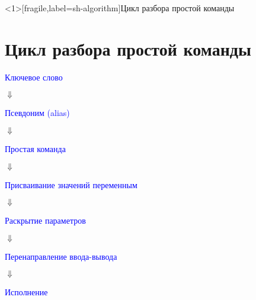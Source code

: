 % 
\begin{frame}<1>[fragile,label=sh-algorithm]{Цикл разбора простой команды}
\section{Цикл разбора простой команды}
\par\vspace{-1em}

\centering \large

\textcolor<2->{blue}{Ключевое слово}

$\Downarrow$

\textcolor<3->{blue}{Псевдоним (alias)}

$\Downarrow$

\textcolor<4->{blue}{Простая команда}

$\Downarrow$

\textcolor<5->{blue}{Присваивание значений переменным}

$\Downarrow$

\textcolor<6->{blue}{Раскрытие параметров}

$\Downarrow$

\textcolor<7->{blue}{Перенаправление ввода-вывода}

$\Downarrow$

\textcolor<8->{blue}{Исполнение}

\end{frame}
